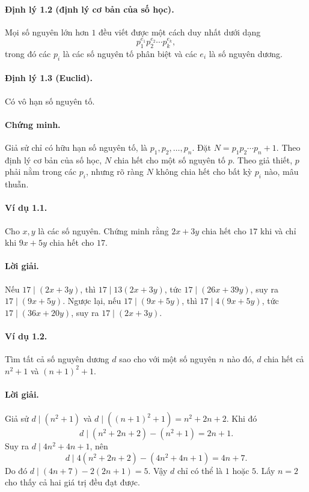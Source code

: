 \documentclass[11pt]{article}
\begin{document}
\paragraph{Định lý 1.2 (định lý cơ bản của số học).}
Mọi số nguyên lớn hơn \(1\) đều viết được một cách duy nhất dưới dạng
\[
  p_1^{e_1}p_2^{e_2}\cdots p_k^{e_k},
\]
trong đó các \(p_i\) là các số nguyên tố phân biệt và các \(e_i\) là số nguyên
dương.

\paragraph{Định lý 1.3 (Euclid).}
Có vô hạn số nguyên tố.

\paragraph{Chứng minh.}
Giả sử chỉ có hữu hạn số nguyên tố, là \(p_1,p_2,\ldots,p_n\). Đặt
\(N=p_1p_2\cdots p_n+1\). Theo định lý cơ bản của số học, \(N\) chia hết cho
một số nguyên tố \(p\). Theo giả thiết, \(p\) phải nằm trong các \(p_i\), nhưng
rõ ràng \(N\) không chia hết cho bất kỳ \(p_i\) nào, mâu thuẫn.

\paragraph{Ví dụ 1.1.}
Cho \(x,y\) là các số nguyên. Chứng minh rằng \(2x+3y\) chia hết cho \(17\)
khi và chỉ khi \(9x+5y\) chia hết cho \(17\).

\paragraph{Lời giải.}
Nếu \(17\mid(2x+3y)\), thì \(17\mid 13(2x+3y)\), tức
\(17\mid(26x+39y)\), suy ra \(17\mid(9x+5y)\). Ngược lại, nếu
\(17\mid(9x+5y)\), thì \(17\mid4(9x+5y)\), tức \(17\mid(36x+20y)\), suy ra
\(17\mid(2x+3y)\).

\paragraph{Ví dụ 1.2.}
Tìm tất cả số nguyên dương \(d\) sao cho với một số nguyên \(n\) nào đó, \(d\)
chia hết cả \(n^2+1\) và \((n+1)^2+1\).

\paragraph{Lời giải.}
Giả sử \(d\mid(n^2+1)\) và \(d\mid((n+1)^2+1)=n^2+2n+2\). Khi đó
\[
 d\mid(n^2+2n+2)-(n^2+1)=2n+1.
\]
Suy ra \(d\mid4n^2+4n+1\), nên
\[
 d\mid4(n^2+2n+2)-(4n^2+4n+1)=4n+7.
\]
Do đó \(d\mid(4n+7)-2(2n+1)=5\). Vậy \(d\) chỉ có thể là \(1\) hoặc \(5\).
Lấy \(n=2\) cho thấy cả hai giá trị đều đạt được.
\end{document}

